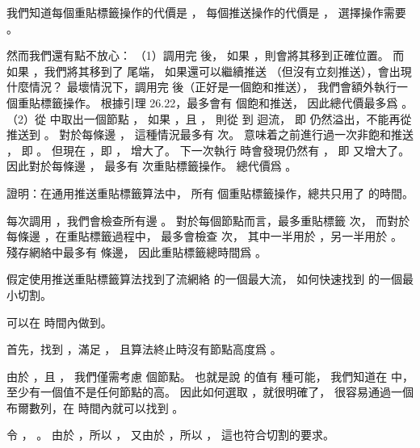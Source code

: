 我們知道每個重貼標籤操作的代價是 ，
每個推送操作的代價是 ，
選擇操作需要 。

然而我們還有點不放心：
（1）調用完  後，
如果 ，則會將其移到正確位置。
而如果 ，我們將其移到了  尾端，
如果還可以繼續推送  （但沒有立刻推送），會出現什麼情況？
最壞情況下，調用完  後（正好是一個飽和推送），
我們會額外執行一個重貼標籤操作。
根據引理 26.22，最多會有  個飽和推送，
因此總代價最多爲 。
（2）從  中取出一個節點 ，
如果 ，且 ，
則從  到  迴流，
即  仍然溢出，不能再從  推送到 。
對於每條邊 ，
這種情況最多有  次。
  意味着之前進行過一次非飽和推送 ，
即 。
但現在 ，即 ，  增大了。
下一次執行  時會發現仍然有 ，
即  又增大了。
因此對於每條邊 ，
最多有  次重貼標籤操作。
總代價爲 。
\stopANSWER

\startEXERCISE
證明：在通用推送重貼標籤算法中，
所有  個重貼標籤操作，總共只用了  的時間。
\stopEXERCISE

\startANSWER
每次調用 ，我們會檢查所有邊 。
對於每個節點而言，最多重貼標籤  次，
而對於每條邊 ，在重貼標籤過程中，
最多會檢查  次，
其中一半用於 ，另一半用於 。
殘存網絡中最多有  條邊，
因此重貼標籤總時間爲 。
\stopANSWER

\startEXERCISE
假定使用推送重貼標籤算法找到了流網絡  的一個最大流，
如何快速找到  的一個最小切割。
\stopEXERCISE

\startANSWER
可以在  時間內做到。

首先，找到 ，滿足 ，
且算法終止時沒有節點高度爲 。

由於 ，且 ，
我們僅需考慮  個節點。
也就是說  的值有  種可能，
我們知道在  中，至少有一個值不是任何節點的高。
因此如何選取 ，就很明確了，
很容易通過一個布爾數列，在  時間內就可以找到 。

令 ， 。
由於 ，所以 ，
又由於 ，所以 ，
這也符合切割的要求。

